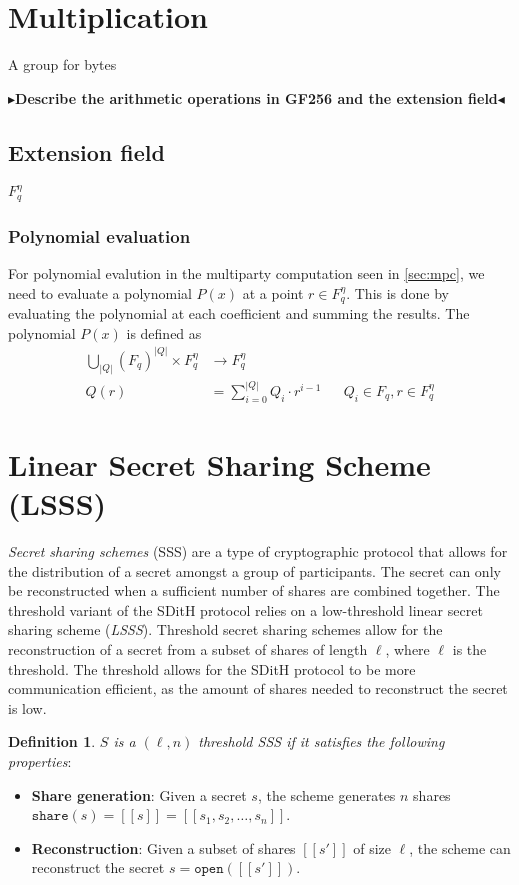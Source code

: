 \documentclass[twoside,11pt,openright]{report}
\theoremstyle{definition}
\newtheorem{definition}{Definition}[section]
\theoremstyle{plain}
\newcommand{\todo}[1]{{\color[rgb]{.5,0,0}\textbf{$\blacktriangleright$#1$\blacktriangleleft$}}}
\begin{document}
\section{Multiplication}

A group for bytes

\todo{Describe the arithmetic operations in GF256 and the extension field}


\subsection{Extension field}
$F_q^\eta$

\subsubsection{Polynomial evaluation}
For polynomial evalution in the multiparty computation seen in \autoref{sec:mpc}, we need to evaluate a polynomial $P(x)$ at a point $r \in F_q^\eta$. This is done by evaluating the polynomial at each coefficient and summing the results. The polynomial $P(x)$ is defined as
\begin{align}
  \textstyle\bigcup_{|Q|}(F_q)^{|Q|} \times F_q^\eta & \rightarrow F_q^\eta                 \nonumber                                  \\
  Q(r)                                               & = \textstyle\sum_{i=0}^{|Q|} Q_i \cdot r^{i-1} &  & Q_i \in F_q, r \in F_q^\eta
  \label{eq:mpcpoly}
\end{align}

\section{Linear Secret Sharing Scheme (LSSS)}
\label{sec:sss}

\textit{Secret sharing schemes} (SSS) are a type of cryptographic protocol that allows for the distribution of a secret amongst a group of participants. The secret can only be reconstructed when a sufficient number of shares are combined together. The threshold variant of the SDitH protocol relies on a low-threshold linear secret sharing scheme (\textit{LSSS}). Threshold secret sharing schemes allow for the reconstruction of a secret from a subset of shares of length $\ell$, where $\ell$ is the threshold. The threshold allows for the SDitH protocol to be more communication efficient, as the amount of shares needed to reconstruct the secret is low.

\begin{definition}
  \label{def:sss}
  \textit{$S$ is a $(\ell,n)$ threshold SSS if it satisfies the following properties}:

  \begin{itemize}
    \item \textbf{Share generation}: Given a secret $s$, the scheme generates $n$ shares $\texttt{share}(s) = [[s]] = [[s_1, s_2, \dots, s_n]]$.
    \item \textbf{Reconstruction}: Given a subset of shares $[[s']]$ of size $\ell$, the scheme can reconstruct the secret $s = \texttt{open}([[s']])$.
  \end{itemize}

\end{definition}
\end{document}

